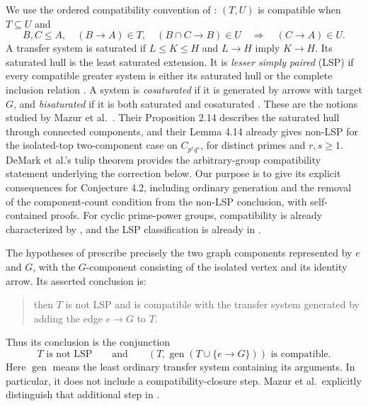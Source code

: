 \documentclass[11pt]{article}
\newcommand{\gen}{\operatorname{gen}}
\begin{document}
We use the ordered compatibility convention of
\cite[Definition 2.14]{K}: $(T,U)$ is compatible when $T\subseteq U$ and
\begin{equation}\label{eq:compatibility}
 B,C\leq A,\quad (B\to A)\in T,\quad (B\cap C\to B)\in U
 \quad\Longrightarrow\quad (C\to A)\in U.
\end{equation}
A transfer system is saturated if $L\leq K\leq H$ and $L\to H$ imply
$K\to H$. Its saturated hull is the least saturated extension.
It is \emph{lesser simply paired} (LSP) if every compatible greater system
is either its saturated hull or the complete inclusion relation
\cite[Definitions 2.15--2.17]{K}.
A system is \emph{cosaturated} if it is generated by arrows with target $G$,
and \emph{bisaturated} if it is both saturated and cosaturated
\cite[Definition 2.18 and Remark 2.19]{K}.
These are the notions studied by Mazur et al.\ \cite{M}.
Their Proposition 2.14 describes the saturated hull through connected
components, and their Lemma 4.14 already gives non-LSP for the isolated-top
two-component case on $C_{p^r q^s}$, for distinct primes and $r,s\geq1$.
DeMark et al.'s tulip theorem \cite[Proposition 3.17]{D} provides the
arbitrary-group compatibility statement underlying the correction below.
Our purpose is to give its explicit consequences for Conjecture 4.2,
including ordinary generation and the removal of the component-count
condition from the non-LSP conclusion, with self-contained proofs.
For cyclic prime-power groups, compatibility is already characterized by
\cite[Proposition 3.2]{HML}, and the LSP classification is already in
\cite[Remark 4.18]{M}.

The hypotheses of \cite[Conjecture 4.2, p.~15]{K} prescribe precisely
the two graph components represented by $e$ and $G$, with the $G$-component
consisting of the isolated vertex and its identity arrow.
Its asserted conclusion is:
\begin{quote}\small
then $T$ is not LSP and is compatible with
the transfer system generated by adding the edge $e\to G$ to $T$.
\end{quote}
Thus its conclusion is the conjunction
\begin{equation}\label{eq:conjecture}
 T\text{ is not LSP}\qquad\text{and}\qquad
 (T,\gen(T\cup\{e\to G\}))\text{ is compatible}.
\end{equation}
Here $\gen$ means the least ordinary transfer system containing its
arguments. In particular, it does not include a compatibility-closure step.
Mazur et al.\ explicitly distinguish that additional step in
\cite[Lemma 3.6]{M}.
\end{document}
